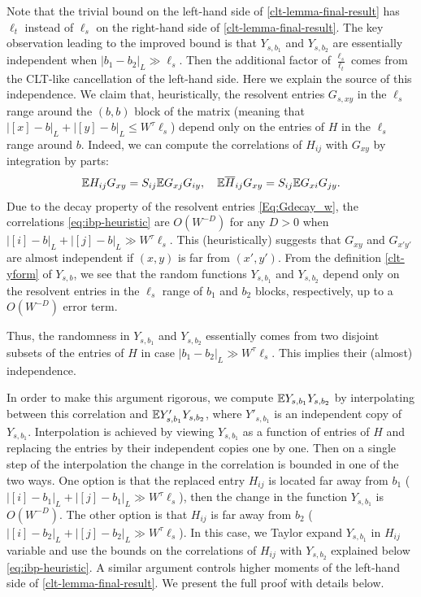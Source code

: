 Note that the trivial bound on the left-hand side of \eqref{clt-lemma-final-result} has $\ell_t$ instead of $\ell_s$ on the right-hand side of \eqref{clt-lemma-final-result}. The key observation leading to the improved bound is that $Y_{s,b_1}$ and $Y_{s, b_2}$ are essentially independent when $|b_1-b_2|_{L}\gg \ell_s$. Then the additional factor of $\frac{\ell_s}{\ell_t}$ comes from the CLT-like cancellation of the left-hand side. Here we explain the source of this independence. We claim that, heuristically, the resolvent entries $G_{s,xy}$ in the $\ell_s$ range around the $(b, b)$ block of the matrix (meaning that $|[x]-b|_{L}+|[y]-b|_{L} \le W^{\tau}\ell_s$) depend only on the entries of $H$ in the $\ell_s$ range around $b$. Indeed, we can compute the correlations of $H_{ij}$ with $G_{xy}$ by integration by parts:
\begin{equation}\label{eq:ibp-heuristic}
    \mathbb{E} H_{ij} G_{xy} = S_{ij}\mathbb{E} G_{xj} G_{iy},\quad \mathbb{E} \overline{H}_{ij} G_{xy} = S_{ij}\mathbb{E} G_{xi} G_{jy}.
\end{equation}
Due to the decay property of the resolvent entries \eqref{Eq:Gdecay_w}, the correlations \eqref{eq:ibp-heuristic} are $O(W^{-D})$ for any $D>0$ when {$|[i]-b|_{L}+|[j]-b|_{L}\gg W^{\tau} \ell_s$}. {This (heuristically) suggests that $G_{xy}$ and $G_{x'y'}$ are almost independent if $(x,y)$ is far from $(x',y')$.} From the definition \eqref{clt-yform} of $Y_{s,b}$, we see that the random functions $Y_{s,b_1}$ and $Y_{s,b_2}$ depend only on the resolvent entries in the $\ell_s$ range of $b_1$ and $b_2$ blocks, respectively, up to a $O(W^{-D})$ error term. 

Thus, the randomness in $Y_{s,b_1}$ and $Y_{s,b_2}$ essentially comes from two disjoint subsets of the entries of $H$ in case $|b_1-b_2|_{L}\gg {W^{\tau}}\ell_s$. This implies their {(almost)} independence. 

In order to make this argument rigorous, we compute $\mathbb{E} Y_{s,b_1} Y_{s,b_2}$ by interpolating between this correlation and $\mathbb{E} Y'_{s,b_1} Y_{s,b_2}$, where $Y'_{s,b_1}$ is an independent copy of $Y_{s,b_1}$. Interpolation is achieved by viewing $Y_{s,b_1}$ as a function of entries of $H$ and replacing the entries by their independent copies one by one. Then on a single step of the interpolation the change in the correlation is bounded in one of the two ways. One option is that the replaced entry $H_{ij}$ is located far away from $b_1$ ($|[i]-b_1|_{L}+|[j]-b_1|_{L}\gg {W^{\tau}}\ell_s$), then the change in the function $Y_{s,b_1}$ is $O(W^{-D})$. The other option is that $H_{ij}$ is far away from $b_2$ ($|[i]-b_2|_{L}+|[j]-b_2|_{L}\gg {W^{\tau}}\ell_s$). In this case, we Taylor expand $Y_{s,b_1}$ in $H_{ij}$ variable and use the bounds on the correlations of $H_{ij}$ with $Y_{s,b_2}$ explained below \eqref{eq:ibp-heuristic}. {A similar argument controls higher moments of the left-hand side of \eqref{clt-lemma-final-result}.} We present the full proof with details below.

